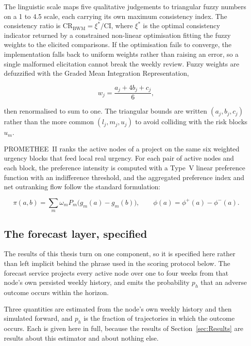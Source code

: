 The linguistic scale maps five qualitative judgements to triangular fuzzy numbers on a
1 to 4.5 scale, each carrying its own maximum consistency index. The consistency ratio is
$\mathrm{CR}_{\text{BWM}} = \xi^*/\mathrm{CI}$, where $\xi^*$ is the optimal consistency
indicator returned by a constrained non-linear optimisation fitting the fuzzy weights to
the elicited comparisons. If the optimisation fails to converge, the implementation falls
back to uniform weights rather than raising an error, so a single malformed elicitation
cannot break the weekly review. Fuzzy weights are defuzzified with the Graded Mean
Integration Representation,

\begin{equation}
    w_j = \frac{a_j + 4 b_j + c_j}{6},
    \label{eq:bwm_defuzz}
\end{equation}

then renormalised to sum to one. The triangular bounds are written $(a_j, b_j, c_j)$ rather
than the more common $(l_j, m_j, u_j)$ to avoid colliding with the risk blocks $u_m$.

PROMETHEE~II ranks the active nodes of a project on the same six weighted urgency blocks
that feed local real urgency. For each pair of active nodes and each block, the preference
intensity is computed with a Type~V linear preference function with an indifference
threshold, and the aggregated preference index and net outranking flow follow the standard
formulation:

\begin{equation}
    \pi(a,b) = \sum_m \omega_m P_m\bigl(g_m(a) - g_m(b)\bigr), \qquad
    \phi(a) = \phi^+(a) - \phi^-(a).
    \label{eq:promethee_net}
\end{equation}



\subsection{The forecast layer, specified}
\label{sec:methods_forecast}

The results of this thesis turn on one component, so it is specified here rather than left
implicit behind the phrase used in the scoring protocol below. The forecast service projects
every active node over one to four weeks from that node's own persisted weekly history, and
emits the probability $p_h$ that an adverse outcome occurs within the horizon.

Three quantities are estimated from the node's own weekly history and then simulated
forward, and $p_h$ is the fraction of trajectories in which the outcome occurs. Each is
given here in full, because the results of Section~\ref{sec:Results} are results about this
estimator and about nothing else.

